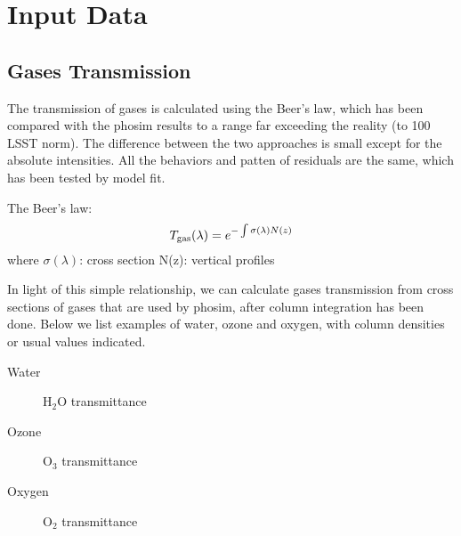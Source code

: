 \documentclass[a4paper,12pt]{article}
\begin{document}
\section{Input Data}
\subsection{Gases Transmission}

The transmission of gases is calculated using the Beer's law, which has been compared with the phosim results to a range far exceeding the reality (to 100 LSST norm). The difference between the two approaches is small except for the absolute intensities. All the behaviors and patten of residuals are the same, which has been tested by model fit.

The Beer's law:
\begin{equation}
T_{\rm gas}(\lambda)=e^{-\int\sigma(\lambda)N(z)}
\end{equation}
where $\sigma(\lambda)$: cross section
N(z): vertical profiles

In light of this simple relationship, we can calculate gases transmission from cross sections of gases that are used by phosim, after column integration has been done. Below we list examples of water, ozone and oxygen, with column densities or usual values indicated.


\graphicspath{{/home/bruno/users/weh40/Pictures/}}
\clearpage
\centering
Water
\begin{figure}[hb!]
\centering
{}


\caption{H$_2$O transmittance}
\end{figure}

\clearpage
Ozone
\begin{figure}[hb!]
\centering
\subfloat[O$_3$=254 DU\label{subfig_1}]{
\texttt{[image: o3cs-o3cs]}
}

\caption{O$_3$ transmittance}
\end{figure}

Oxygen
\begin{figure}[hb!]
\centering
{}

\caption{O$_2$ transmittance}
\end{figure}
\end{document}

